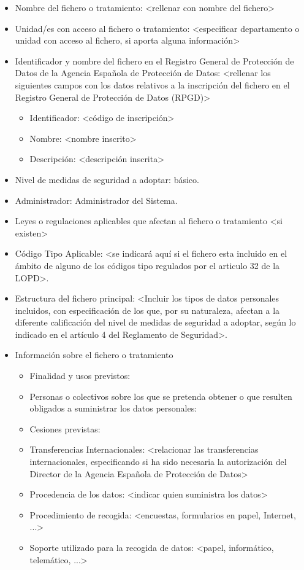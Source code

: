 \documentclass[a4paper,11pt,bibtotoc,noliststotoc]{scrbook}
\begin{document}
\begin{itemize}
\item Nombre del fichero o tratamiento: <rellenar con nombre del fichero>

\item Unidad/es con acceso al fichero o tratamiento: <especificar departamento o unidad con acceso al fichero, si aporta alguna información>

\item Identificador y nombre del fichero en el Registro General de Protección de Datos de la Agencia Española de Protección de Datos: <rellenar los siguientes campos con los datos relativos a la inscripción del fichero en el Registro General de Protección de Datos (RPGD)>
	\begin{itemize}
	\item Identificador: <código de inscripción>
	\item Nombre: <nombre inscrito>
	\item Descripción: <descripción inscrita>
	\end{itemize}

\item Nivel de medidas de seguridad a adoptar: básico.

\item Administrador: Administrador del Sistema.

\item Leyes o regulaciones aplicables que afectan al fichero o tratamiento <si existen>

\item Código Tipo Aplicable: <se indicará aquí si el fichero esta incluido en el ámbito de alguno de los códigos tipo regulados por el articulo 32 de la LOPD>.

\item Estructura del fichero principal: <Incluir los tipos de datos personales incluidos, con especificación de los que, por su naturaleza, afectan a la diferente calificación del nivel de medidas de seguridad a adoptar, según lo indicado en el artículo 4 del Reglamento de Seguridad>.

\item Información sobre el fichero o tratamiento
	\begin{itemize}
	\item Finalidad y usos previstos:
	\item Personas o colectivos sobre los que se pretenda obtener o que resulten obligados a suministrar los datos personales:
	\item Cesiones previstas:
	\item Transferencias Internacionales: <relacionar las transferencias internacionales, especificando si ha sido necesaria la autorización del Director de la Agencia Española de Protección de Datos>
	\item Procedencia de los datos: <indicar quien suministra los datos>
	\item Procedimiento de recogida: <encuestas, formularios en papel, Internet, ...>
	\item Soporte utilizado para la recogida de datos: <papel, informático, telemático, ...>
	\end{itemize}


\end{itemize}
\end{document}
